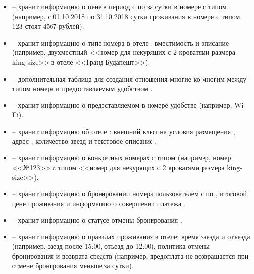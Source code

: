 \begin{itemize}
	\item {} -- хранит информацию о цене  в период с  по  за сутки в номере с типом  (например, с 01.10.2018 по 31.10.2018 сутки проживания в номере с типом 123 стоят 4567 рублей).
	
	\item {} -- хранит информацию о типе номера  в отеле : вместимость  и описание  (например, двухместный <<номер для некурящих с 2 кроватями размера king-size>> в отеле <<Гранд Будапешт>>).
	
	\item {} -- дополнительная таблица для создания отношения многие ко многим между типом номера  и предоставляемым удобством .
	
	\item {} -- хранит информацию о предоставляемом в номере удобстве  (например, Wi-Fi).
	
	\item {} -- хранит информацию об отеле : внешний ключ на условия размещения , адрес , количество звезд  и текстовое описание .
	
	\item {} -- хранит информацию о конкретных номерах с типом  (например, номер <<№123>> c типом <<номер для некурящих с 2 кроватями размера king-size>>).
	
	\item {} -- хранит информацию о бронировании номера  пользователем  с  по , итоговой цене проживания  и информацию о совершении платежа .
	
	\item {} -- хранит информацию о статусе  отмены бронирования .
	
	\item {} -- хранит информацию о правилах проживания в отеле: время заезда  и отъезда  (например, заезд после 15:00, отъезд до 12:00), политика отмены бронирования и возврата средств  (например, предоплата не возвращается при отмене бронирования меньше за сутки).
	

\end{itemize}
